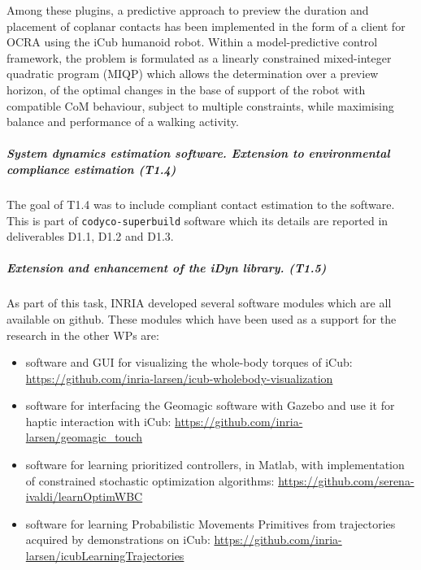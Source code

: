 Among these plugins, a predictive approach \cite{ibanez2015Emergence} to
preview the duration and placement of coplanar contacts has been implemented
in the form of a client for OCRA using the iCub humanoid robot.  Within a
model-predictive control framework, the problem is formulated as a linearly
constrained mixed-integer quadratic program (MIQP) which allows the
determination over a preview horizon, of the optimal changes in the base of
support of the robot with compatible CoM behaviour, subject to multiple
constraints, while maximising balance and performance of a walking activity.



\subparagraph{System dynamics estimation software. Extension to
environmental compliance estimation (T1.4)}

The goal of T1.4 was to include compliant contact estimation to the software.
This is part of \texttt{codyco-superbuild} software which its details are
reported in deliverables D1.1, D1.2 and D1.3.


\subparagraph{Extension and enhancement of the iDyn library. (T1.5)}

As part of this task, INRIA developed several software modules which are all
available on github.  These modules which have been used as a support for the
research in the other WPs are:
\begin{itemize}
  \item software and GUI for visualizing the whole-body torques of iCub:
    \url{https://github.com/inria-larsen/icub-wholebody-visualization}
  \item software for interfacing the Geomagic software with Gazebo and use it
    for haptic interaction with iCub:
    \url{https://github.com/inria-larsen/geomagic_touch}
  \item software for learning prioritized controllers, in Matlab, with
    implementation of constrained stochastic optimization algorithms:
    \url{https://github.com/serena-ivaldi/learnOptimWBC}
  \item software for learning Probabilistic Movements Primitives from
    trajectories acquired by demonstrations on iCub:
    \url{https://github.com/inria-larsen/icubLearningTrajectories}
\end{itemize}

